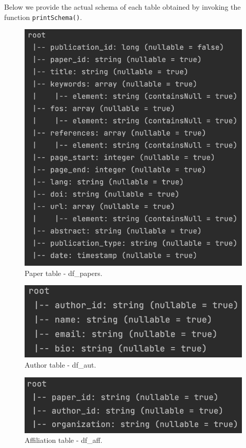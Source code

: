 Below we provide the actual schema of each table obtained by invoking the function \verb|printSchema()|.
\begin{figure}[H]
    \begin{center}
        \includegraphics[width=0.6\linewidth]{ImagesSpark/paper_schema}
        \caption{Paper table - df\_papers.}
        \label{fig:figure4_1}%
    \end{center}
\end{figure}
\begin{figure}[H]
    \begin{center}
        \includegraphics[width=0.6\linewidth]{ImagesSpark/author_schema}
        \caption{Author table - df\_aut.}
        \label{fig:figure4_2}%
    \end{center}
\end{figure}
\begin{figure}[H]
    \begin{center}
        \includegraphics[width=0.6\linewidth]{ImagesSpark/affiliation_schema}
        \caption{Affiliation table - df\_aff.}
        \label{fig:figure4_3}%
    \end{center}
\end{figure}
